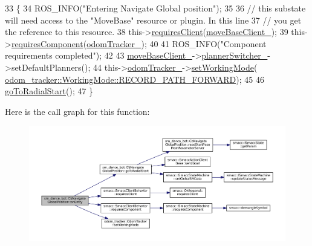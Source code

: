\begin{DoxyCode}
33   \{
34     ROS\_INFO(\textcolor{stringliteral}{"Entering Navigate Global position"});
35 
36     \textcolor{comment}{// this substate will need access to the "MoveBase" resource or plugin. In this line}
37     \textcolor{comment}{// you get the reference to this resource.}
38     this->\hyperlink{classsmacc_1_1SmaccClientBehavior_adc21bbd45d36bd81ca6f778ed161807a}{requiresClient}(\hyperlink{classsm__dance__bot_1_1CbNavigateGlobalPosition_a6b070ea39c113269c9b7f7732cb9e033}{moveBaseClient\_});
39     this->\hyperlink{classsmacc_1_1SmaccClientBehavior_a011246bb1424f8bf8c9322f652db9d88}{requiresComponent}(\hyperlink{classsm__dance__bot_1_1CbNavigateGlobalPosition_a95241571dd7b9af5b7e723d63e8325a3}{odomTracker\_});
40 
41     ROS\_INFO(\textcolor{stringliteral}{"Component requirements completed"});
42 
43     \hyperlink{classsm__dance__bot_1_1CbNavigateGlobalPosition_a6b070ea39c113269c9b7f7732cb9e033}{moveBaseClient\_}->\hyperlink{classsmacc_1_1ClMoveBaseZ_a712e0df77c9629930e03cbb4c539b485}{plannerSwitcher\_}->setDefaultPlanners();
44     this->\hyperlink{classsm__dance__bot_1_1CbNavigateGlobalPosition_a95241571dd7b9af5b7e723d63e8325a3}{odomTracker\_}->\hyperlink{classodom__tracker_1_1OdomTracker_ac001a40d1107ef0d88aa7db03cafb08c}{setWorkingMode}(
      \hyperlink{namespaceodom__tracker_a4daf27fd157b1a481fdfd6f90de00b88a989d06a586bcf9520889228da7faa643}{odom\_tracker::WorkingMode::RECORD\_PATH\_FORWARD});
45 
46     \hyperlink{classsm__dance__bot_1_1CbNavigateGlobalPosition_a0832f7a7f205cc483be012aef9501312}{goToRadialStart}();
47   \}
\end{DoxyCode}


Here is the call graph for this function\+:
\nopagebreak
\begin{figure}[H]
\begin{center}
\leavevmode
\includegraphics[width=350pt]{classsm__dance__bot_1_1CbNavigateGlobalPosition_a281fe5c962ca5004f44e929159991c6a_cgraph}
\end{center}
\end{figure}


